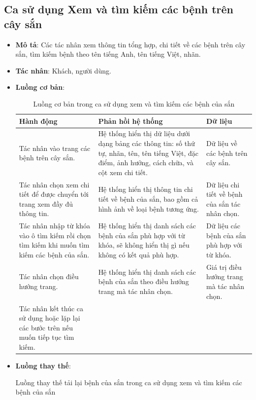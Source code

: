 \documentclass[./../main.tex]{subfiles}
\begin{document}
\subsection{Ca sử dụng Xem và tìm kiếm các bệnh trên cây sắn}
\begin{itemize}
    \item \textbf{Mô tả}: Các tác nhân xem thông tin tổng hợp, chi tiết về các bệnh trên cây sắn, tìm kiếm bệnh theo tên tiếng Anh, tên tiếng Việt, nhãn.
    \item \textbf{Tác nhân}: Khách, người dùng.
    \item \textbf{Luồng cơ bản}:
    \begin{table}[H]
    \caption{\label{uc-19}Luồng cơ bản trong ca sử dụng xem và tìm kiếm các bệnh của sắn}
    \begin{tabularx}{\textwidth}{| X | X | X |}
        \hline
        \textbf{Hành động} & \textbf{Phản hồi hệ thống} & \textbf{Dữ liệu} \\ \hline
        Tác nhân vào trang các bệnh trên cây sắn. & Hệ thống hiển thị dữ liệu dưới dạng bảng các thông tin: số thứ tự, nhãn, tên, tên tiếng Việt, đặc điểm, ảnh hưởng, cách chữa, và cột xem chi tiết. & Dữ liệu về các bệnh trên cây sắn.
        \\ \hline
        Tác nhân chọn xem chi tiết để được chuyển tới trang xem đầy đủ thông tin. & Hệ thống hiển thị thông tin chi tiết về bệnh của sắn, bao gồm cả hình ảnh về loại bệnh tương ứng. & Dữ liệu chi tiết về bệnh của sắn tác nhân chọn.
        \\ \hline
        Tác nhân nhập từ khóa vào ô tìm kiếm rồi chọn tìm kiếm khi muốn tìm kiếm các bệnh của sắn. & Hệ thống hiển thị danh sách các bệnh của sắn phù hợp với từ khóa, sẽ không hiển thị gì nếu không có kết quả phù hợp. & Dữ liệu các bệnh của sắn phù hợp với từ khóa.
        \\ \hline
        Tác nhân chọn điều hướng trang. & Hệ thống hiển thị danh sách các bệnh của sắn theo điều hướng trang mà tác nhân chọn. & Giá trị điều hướng trang mà tác nhân chọn.
        \\ \hline
        Tác nhân kết thúc ca sử dụng hoặc lặp lại các bước trên nếu muốn tiếp tục tìm kiếm. & &
        \\ \hline
    \end{tabularx}
    \end{table}    
    \item \textbf{Luồng thay thế}:
        \begin{table}[H]
        \caption{\label{uc-20}Luồng thay thế tải lại bệnh của sắn trong ca sử dụng xem và tìm kiếm các bệnh của sắn}

\end{table}
\end{itemize}
\end{document}
